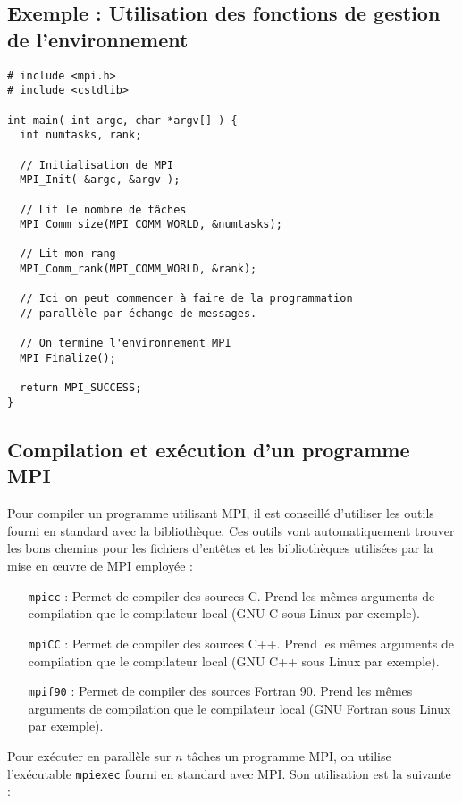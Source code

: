\documentclass[11pt,a4paper]{article}
\begin{document}
\subsection{Exemple : Utilisation des fonctions de gestion de l'environnement}

\begin{lstlisting}[style=customcpp]
# include <mpi.h>
# include <cstdlib>

int main( int argc, char *argv[] ) {
  int numtasks, rank;

  // Initialisation de MPI
  MPI_Init( &argc, &argv );

  // Lit le nombre de tâches
  MPI_Comm_size(MPI_COMM_WORLD, &numtasks);

  // Lit mon rang
  MPI_Comm_rank(MPI_COMM_WORLD, &rank);

  // Ici on peut commencer à faire de la programmation
  // parallèle par échange de messages.

  // On termine l'environnement MPI
  MPI_Finalize();

  return MPI_SUCCESS;	
}
\end{lstlisting}

\subsection{Compilation et exécution d'un programme MPI}

Pour compiler un programme utilisant MPI, il est conseillé d'utiliser les outils fourni en standard avec la
bibliothèque. Ces outils vont automatiquement trouver les bons chemins pour les fichiers d'entêtes et les bibliothèques
utilisées par la mise en {\oe}uvre de MPI employée :
\begin{itemize}
\item[\texttt{mpicc}] : Permet de compiler des sources C. Prend les mêmes arguments de compilation que le compilateur local (GNU C sous Linux par exemple).
\item[\texttt{mpiCC}] : Permet de compiler des sources C++. Prend les mêmes arguments de compilation que le compilateur local (GNU C++ sous Linux par exemple).
\item[\texttt{mpif90}] : Permet de compiler des sources Fortran 90. Prend les mêmes arguments de compilation que le compilateur local (GNU Fortran sous Linux par exemple).
\end{itemize}

Pour exécuter en parallèle sur $n$ tâches un programme MPI, on utilise l'exécutable \texttt{mpiexec} fourni en
standard avec MPI. Son utilisation est la suivante :
\end{document}

